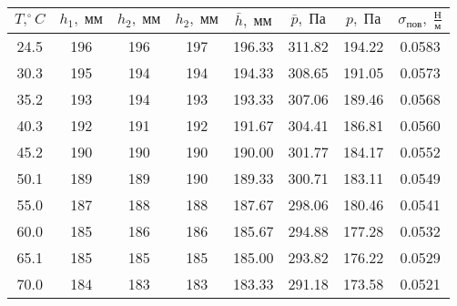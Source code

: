 \begin{tabular}{cccccccc}
\toprule
$T, ^{\circ} C$ & $h_1, \; \text{мм}$ & $h_2, \; \text{мм}$ & $h_2, \; \text{мм}$ &
$\bar{h}, \; \text{мм}$ & $\bar{p}, \; \text{Па}$ & $p, \; \text{Па}$ & $\sigma_\text{пов}, \; \frac{\text{Н}}{\text{м}}$ \\
\midrule
24.5 & 196 & 196 & 197 & 196.33 & 311.82 & 194.22 & 0.0583 \\
30.3 & 195 & 194 & 194 & 194.33 & 308.65 & 191.05 & 0.0573 \\
35.2 & 193 & 194 & 193 & 193.33 & 307.06 & 189.46 & 0.0568 \\
40.3 & 192 & 191 & 192 & 191.67 & 304.41 & 186.81 & 0.0560 \\
45.2 & 190 & 190 & 190 & 190.00 & 301.77 & 184.17 & 0.0552 \\
50.1 & 189 & 189 & 190 & 189.33 & 300.71 & 183.11 & 0.0549 \\
55.0 & 187 & 188 & 188 & 187.67 & 298.06 & 180.46 & 0.0541 \\
60.0 & 185 & 186 & 186 & 185.67 & 294.88 & 177.28 & 0.0532 \\
65.1 & 185 & 185 & 185 & 185.00 & 293.82 & 176.22 & 0.0529 \\
70.0 & 184 & 183 & 183 & 183.33 & 291.18 & 173.58 & 0.0521 \\
\bottomrule
\end{tabular}